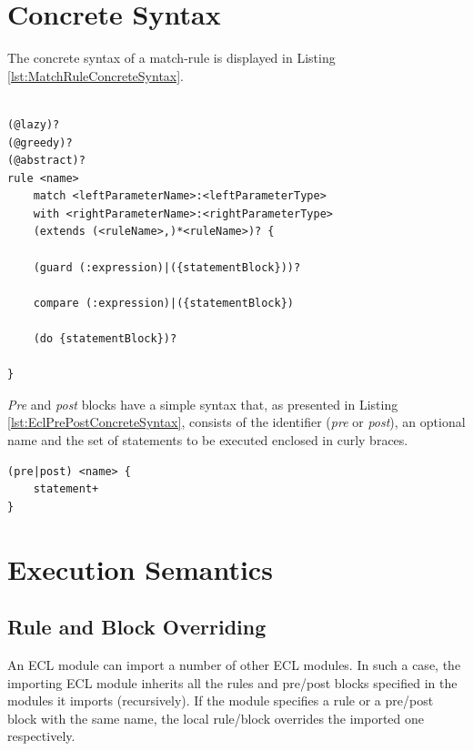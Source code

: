 \section{Concrete Syntax}

The concrete syntax of a match-rule is displayed in Listing \ref{lst:MatchRuleConcreteSyntax}.

\begin{lstlisting}[basicstyle=\ttfamily\footnotesize, flexiblecolumns=true, numbers=none, nolol=true, caption=Concrete Syntax of a MatchRule, label=lst:MatchRuleConcreteSyntax, language=ECL, numbers=left, tabsize=2]

(@lazy)?
(@greedy)?
(@abstract)? 
rule <name> 
	match <leftParameterName>:<leftParameterType>
	with <rightParameterName>:<rightParameterType>
	(extends (<ruleName>,)*<ruleName>)? {
	
	(guard (:expression)|({statementBlock}))?
	
	compare (:expression)|({statementBlock})
	
	(do {statementBlock})?
	
}
\end{lstlisting}

\emph{Pre} and \emph{post} blocks have a simple syntax that, as presented in Listing \ref{lst:EclPrePostConcreteSyntax}, consists of the identifier (\emph{pre} or \emph{post}), an optional name and the set of statements to be executed enclosed in curly braces.

\begin{lstlisting}[basicstyle=\ttfamily\footnotesize, flexiblecolumns=true, numbers=none, nolol=true, caption=Concrete Syntax of Pre and Post blocks, label=lst:EclPrePostConcreteSyntax, language=ECL, numbers=left, tabsize=2]
(pre|post) <name> {
	statement+
}
\end{lstlisting}

\section{Execution Semantics}

\subsection{Rule and Block Overriding}

An ECL module can import a number of other ECL modules. In such a case, the importing ECL module inherits all the rules and pre/post blocks specified in the modules it imports (recursively). If the module specifies a rule or a pre/post block with the same name, the local rule/block overrides the imported one respectively.

